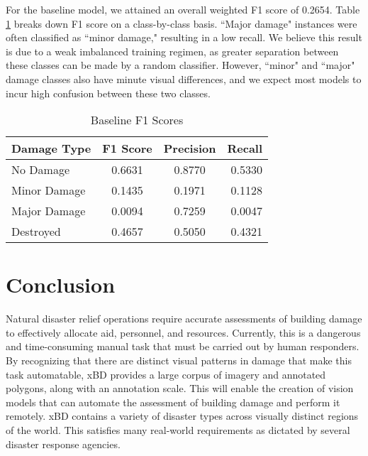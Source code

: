 \documentclass[10pt,twocolumn,letterpaper]{article}
\begin{document}
For the baseline model, we attained an overall weighted F1 score of 0.2654. Table \ref{table:baseline.f1} breaks down F1 score on a class-by-class basis.
``Major damage" instances were often classified as ``minor damage," resulting in a low recall.
We believe this result is due to a weak imbalanced training regimen, as greater separation between these classes can be made by a random classifier.
However, ``minor" and ``major" damage classes also have minute visual differences, and we expect most models to incur high confusion between these two classes.

\begin{table}[h]
	\centering \begin{tabular}{l c c r} \hline
		Damage Type & F1 Score & Precision & Recall
		\\ [0.5ex]
		\hline No Damage & 0.6631 & 0.8770 & 0.5330 \\[-0.25ex]
		Minor Damage & 0.1435 & 0.1971 &  0.1128 \\[-0.25ex]
		Major Damage & 0.0094 & 0.7259 &  0.0047 \\[-0.25ex]
		Destroyed & 0.4657 & 0.5050 &  0.4321 \\[-0.25ex]
		\hline \end{tabular}
	\caption{Baseline F1 Scores} \label{table:baseline.f1}
\end{table}







\vspace{-0.5cm}
\section{Conclusion}
Natural disaster relief operations  require accurate assessments of building damage  to effectively allocate aid, personnel, and resources.
Currently, this is a dangerous and time-consuming manual task that must be carried out by human responders.
By recognizing that there are distinct visual patterns in damage that make this task automatable, xBD provides a large corpus of imagery and annotated polygons, along with an annotation scale. This will enable the creation of vision models that can automate the assessment of building damage and perform it remotely.
xBD contains a variety of disaster types across visually distinct regions of the world. This satisfies many real-world requirements as dictated by several disaster response agencies.
\end{document}
